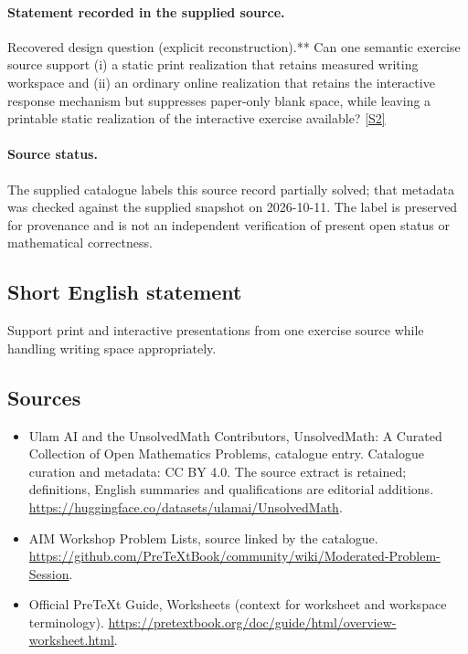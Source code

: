 \documentclass[11pt]{article}
\newcommand{\sref}[2]{\hyperlink{source:#1:#2}{[S#2]}}
\begin{document}
\paragraph{Statement recorded in the supplied source.}
Recovered design question (explicit reconstruction).** Can one semantic exercise source support (i) a static print realization that retains measured writing workspace and (ii) an ordinary online realization that retains the interactive response mechanism but suppresses paper-only blank space, while leaving a printable static realization of the interactive exercise available? \sref{statement}{2}
\paragraph{Source status.}
The supplied catalogue labels this source record partially solved; that metadata was checked against the supplied snapshot on 2026-10-11. The label is preserved for provenance and is not an independent verification of present open status or mathematical correctness.
\subsection{Short English statement}
Support print and interactive presentations from one exercise source while handling writing space appropriately.
\subsection{Sources}
\begin{itemize}
\item[\hypertarget{source:statement:1}{S1}] Ulam AI and the UnsolvedMath Contributors, UnsolvedMath: A Curated Collection of Open Mathematics Problems, catalogue entry. Catalogue curation and metadata: CC BY 4.0. The source extract is retained; definitions, English summaries and qualifications are editorial additions.
\url{https://huggingface.co/datasets/ulamai/UnsolvedMath}.
\item[\hypertarget{source:statement:2}{S2}] AIM Workshop Problem Lists, source linked by the catalogue.
\url{https://github.com/PreTeXtBook/community/wiki/Moderated-Problem-Session}.
\item[\hypertarget{source:statement:3}{S3}] Official PreTeXt Guide, Worksheets (context for worksheet and workspace terminology).
\url{https://pretextbook.org/doc/guide/html/overview-worksheet.html}.
\end{itemize}
\end{document}
